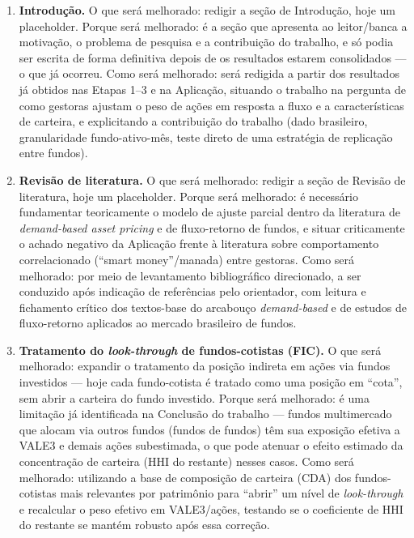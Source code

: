 \documentclass[12pt]{article}
\begin{document}
\begin{enumerate}[leftmargin=*, itemsep=0.4cm]

\item \textbf{Introdução.} O que será melhorado: redigir a seção de Introdução, hoje um
placeholder. Porque será melhorado: é a seção que apresenta ao leitor/banca a motivação, o
problema de pesquisa e a contribuição do trabalho, e só podia ser escrita de forma definitiva
depois de os resultados estarem consolidados --- o que já ocorreu. Como será melhorado: será
redigida a partir dos resultados já obtidos nas Etapas 1--3 e na Aplicação, situando o trabalho na
pergunta de como gestoras ajustam o peso de ações em resposta a fluxo e a características de
carteira, e explicitando a contribuição do trabalho (dado brasileiro, granularidade
fundo-ativo-mês, teste direto de uma estratégia de replicação entre fundos).

\item \textbf{Revisão de literatura.} O que será melhorado: redigir a seção de Revisão de
literatura, hoje um placeholder. Porque será melhorado: é necessário fundamentar teoricamente o
modelo de ajuste parcial dentro da literatura de \emph{demand-based asset pricing} e de
fluxo-retorno de fundos, e situar criticamente o achado negativo da Aplicação frente à literatura
sobre comportamento correlacionado (``smart money''/manada) entre gestoras. Como será melhorado:
por meio de levantamento bibliográfico direcionado, a ser conduzido após indicação de referências
pelo orientador, com leitura e fichamento crítico dos textos-base do arcabouço \emph{demand-based}
e de estudos de fluxo-retorno aplicados ao mercado brasileiro de fundos.

\item \textbf{Tratamento do \emph{look-through} de fundos-cotistas (FIC).} O que será melhorado:
expandir o tratamento da posição indireta em ações via fundos investidos --- hoje cada
fundo-cotista é tratado como uma posição em ``cota'', sem abrir a carteira do fundo investido.
Porque será melhorado: é uma limitação já identificada na Conclusão do trabalho --- fundos
multimercado que alocam via outros fundos (fundos de fundos) têm sua exposição efetiva a VALE3 e
demais ações subestimada, o que pode atenuar o efeito estimado da concentração de carteira (HHI
do restante) nesses casos. Como será melhorado: utilizando a base de composição de carteira (CDA)
dos fundos-cotistas mais relevantes por patrimônio para ``abrir'' um nível de \emph{look-through}
e recalcular o peso efetivo em VALE3/ações, testando se o coeficiente de HHI do restante se
mantém robusto após essa correção.

\end{enumerate}
\end{document}
